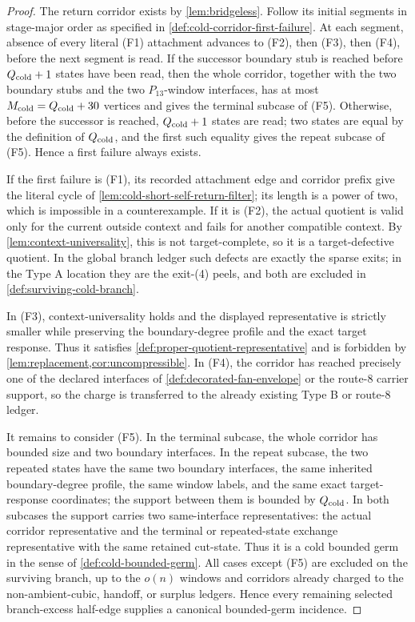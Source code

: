 \documentclass[11pt]{article}
\begin{document}
\begin{proof}
The return corridor exists by \cref{lem:bridgeless}.  Follow its initial
segments in stage-major order as specified in
\cref{def:cold-corridor-first-failure}.  At each segment, absence of every
literal \textup{(F1)} attachment advances to \textup{(F2)}, then
\textup{(F3)}, then \textup{(F4)}, before the next segment is read.  If the
successor boundary stub
is reached before \(Q_{\rm cold}+1\) states have been read, then the whole
corridor, together with the two boundary stubs and the two \(P_{13}\)-window
interfaces, has at most \(M_{\rm cold}=Q_{\rm cold}+30\) vertices and gives the
terminal subcase of (F5).  Otherwise, before the successor is reached,
\(Q_{\rm cold}+1\) states are read; two states are equal by the definition of
\(Q_{\rm cold}\), and the first such equality gives the repeat subcase of
(F5).  Hence a first failure always exists.

If the first failure is (F1), its recorded attachment edge and corridor prefix
give the literal cycle of \cref{lem:cold-short-self-return-filter}; its length
is a power of two, which is impossible in a counterexample.  If it is (F2),
the actual quotient is valid only for the current outside context and fails
for another compatible context.  By \cref{lem:context-universality}, this is
not target-complete, so it is a target-defective quotient.  In the global
branch ledger such defects are exactly the sparse exits; in the Type A
location they are the exit-\textup{(4)} peels, and both are excluded in
\cref{def:surviving-cold-branch}.

In (F3), context-universality holds and the displayed representative is
strictly smaller while preserving the boundary-degree profile and the exact
target response.  Thus it satisfies
\cref{def:proper-quotient-representative} and is forbidden by
\cref{lem:replacement,cor:uncompressible}.  In (F4), the corridor has reached
precisely one of the declared interfaces of
\cref{def:decorated-fan-envelope} or the route-8 carrier support, so the
charge is transferred to the already existing Type B or route-8 ledger.

It remains to consider (F5).  In the terminal subcase, the whole corridor has
bounded size and two boundary interfaces.  In the repeat subcase, the two
repeated states have the same two boundary interfaces, the same inherited
boundary-degree profile, the same window labels, and the same exact
target-response coordinates; the support between them is bounded by
\(Q_{\rm cold}\).  In both subcases the support carries two same-interface
representatives: the actual corridor representative and the terminal or
repeated-state exchange representative with the same retained cut-state.  Thus
it is a cold bounded germ in the sense of \cref{def:cold-bounded-germ}.  All
cases except (F5) are excluded on the surviving branch, up to the \(o(n)\)
windows and corridors already charged to the non-ambient-cubic, handoff, or
surplus ledgers.  Hence every remaining selected branch-excess half-edge
supplies a canonical bounded-germ incidence.
\end{proof}
\end{document}
